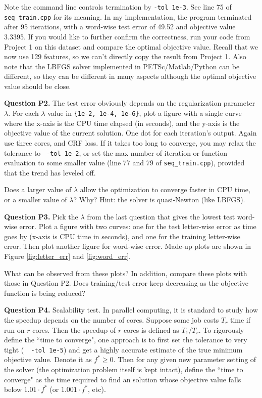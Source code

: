 \documentclass[11pt]{report}
\begin{document}
Note the command line controls termination by \verb!-tol 1e-3!.
See line 75 of \verb!seq_train.cpp! for its meaning.
In my implementation, the program terminated after 95 iterations,
with a word-wise test error of 49.52 and objective value 3.3395.
If you would like to further confirm the correctness,
run your code from Project 1 on this dataset and compare the optimal objective value.
Recall that we now use 129 features, so we can't directly copy the result from Project 1.
Also note that the LBFGS solver implemented in PETSc/Matlab/Python can be different,
so they can be different in many aspects although the optimal objective value should be close.

{\bf Question P2.}
The test error obviously depends on the regularization parameter $\lambda$. For each $\lambda$ value in \verb!{1e-2, 1e-4, 1e-6}!, plot a figure with a single curve where the x-axis is the CPU time elapsed (in seconds), and the y-axis is the objective value of the current solution.
One dot for each iteration's output.
Again use three cores, and CRF loss.
If it takes too long to converge,
you may relax the tolerance to \eg\ \verb!-tol 1e-2!,
or set the max number of iteration or function evaluation to some smaller value
(line 77 and 79 of \verb!seq_train.cpp!),
provided that the trend has leveled off.

Does a larger value of $\lambda$ allow the optimization to converge faster in CPU time,
or a smaller value of $\lambda$?  Why?
Hint: the solver is quasi-Newton (like LBFGS).

{\bf Question P3.}
Pick the $\lambda$ from the last question that gives the lowest test word-wise error.
Plot a figure with two curves:
one for the test letter-wise error as time goes by (x-axis is CPU time in seconds),
and one for the training letter-wise error.
Then plot another figure for word-wise error.
Made-up plots are shown in Figure \ref{fig:letter_err} and \ref{fig:word_err}.

What can be observed from these plots?
In addition, compare these plots with those in Question P2.
Does training/test error keep decreasing as the objective function is being reduced?





{\bf Question P4.}
Scalability test.
In parallel computing, it is standard to study how the speedup depends on the number of cores.
Suppose some job costs $T_r$ time if run on $r$ cores.
Then the speedup of $r$ cores is defined as $T_1 / T_r$.
To rigorously define the ``time to converge",
one approach is to first set the tolerance to very tight (\eg\ \verb! -tol 1e-5!)
and get a highly accurate estimate of the true minimum objective value.
Denote it as $f^* \ge 0$.
Then for any given new parameter setting of the solver (the optimization problem itself is kept intact), define the ``time to converge" as the time required to find an solution whose objective value falls below $1.01 \cdot f^*$ (or  $1.001 \cdot f^*$, etc).
\end{document}
